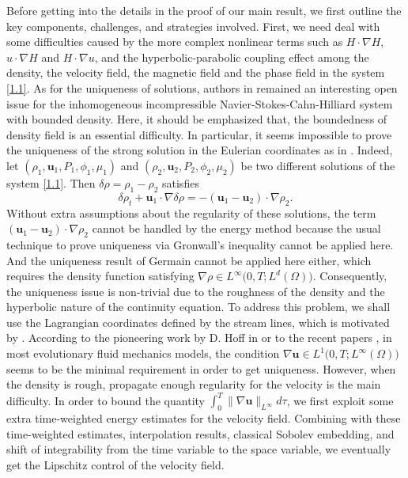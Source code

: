 \documentclass[11pt]{article}
\numberwithin{equation}{section}
\begin{document}
Before getting into the details in the proof of our main result, we first outline the key components, challenges, and strategies involved. First,
we  need  deal with some  difficulties caused by the more complex nonlinear terms such as  $H\cdot \nabla H$, $u\cdot \nabla H$  and  $H\cdot \nabla u$,    and the hyperbolic-parabolic  coupling effect among the density,  the velocity field,  the magnetic field  and the phase field in the  system \eqref{1.1}. As for the uniqueness of solutions,  authors in \cite{AR1}  remained  an interesting open  issue for the inhomogeneous incompressible Navier-Stokes-Cahn-Hilliard system with   bounded  density. Here, it should be emphasized that, the boundedness of density field is an essential difficulty. In particular, it seems impossible to prove the uniqueness of the strong  solution in the Eulerian coordinates as in \cite{CHK,GT1,Lijinkai}. Indeed, let $(\rho_{1},\mathbf{u}_{1},P_{1},\phi_{1},\mu_{1})$ and $(\rho_{2},\mathbf{u}_{2},P_{2},\phi_{2},\mu_{2})$ be two different solutions of the  system \eqref{1.1}. Then
 $\delta \rho=\rho_1-\rho_2$ satisfies
 \begin{equation*}
\delta \rho_t + \mathbf{u}_1 \cdot \nabla \delta \rho = - (\mathbf{u}_1 - \mathbf{u}_2) \cdot \nabla \rho_2.
\end{equation*}
Without extra assumptions about the regularity of these solutions, the term $(\mathbf{u}_1 - \mathbf{u}_2) \cdot \nabla \rho_2$ cannot be handled by the energy method because the usual technique to prove uniqueness via Gronwall's inequality  cannot be applied here. And the uniqueness result of Germain \cite{PG} cannot be applied here either, which requires the density function satisfying
 $\nabla \rho \in L^{\infty}\big(0,T; L^{d}(\Omega)\big)$. Consequently, the uniqueness issue is non-trivial due to the roughness of the density and the hyperbolic nature of the continuity equation. To address this problem, we shall use the Lagrangian coordinates defined by the stream lines, which is motivated by \cite{RB1,RB,PZZ}. %
 According to the pioneering work by D. Hoff in \cite{DH} or to the recent papers \cite{RB1,RB,PZZ}, in most evolutionary fluid mechanics models, the condition  $\nabla \mathbf{u} \in L^{1}\big(0,T; L^{\infty}(\Omega)\big)$   seems to be the minimal requirement in order to get
uniqueness. However,  when the density is rough, propagate enough regularity for the velocity is the main difficulty. In order to  bound the quantity $\int_{0}^{T}\|\nabla \mathbf{u}\|_{L^{\infty}}d\tau$,  we first  exploit some  extra time-weighted energy estimates for the velocity field. Combining with these time-weighted estimates, interpolation results, classical Sobolev embedding, and shift of integrability from the time variable to the space variable, we eventually get the Lipschitz control of the velocity field.
\end{document}
